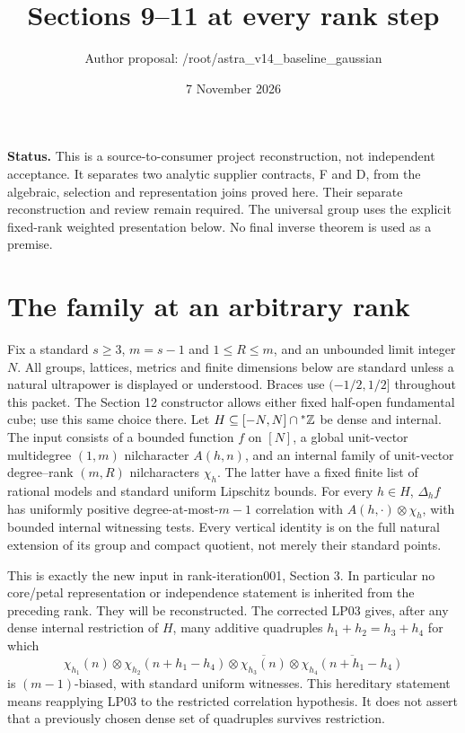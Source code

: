 \documentclass[11pt]{article}
\title{Sections 9--11 at every rank step}
\author{Author proposal: /root/astra\_v14\_baseline\_gaussian}
\date{7 November 2026}
\begin{document}
\maketitle

\noindent\textbf{Status.} This is a source-to-consumer project reconstruction,
not independent acceptance. It separates two analytic supplier contracts,
\textup{F} and \textup{D}, from the algebraic, selection and representation
joins proved here. Their separate reconstruction and review remain required.
The universal group uses the explicit fixed-rank weighted presentation below.
No final inverse theorem is used as a premise.

\section{The family at an arbitrary rank}
Fix a standard $s\geq3$, $m=s-1$ and $1\leq R\leq m$, and an unbounded
limit integer $N$. All groups, lattices, metrics and finite dimensions below
are standard unless a natural ultrapower is displayed or understood.
Braces use $(-1/2,1/2]$ throughout this packet. The Section 12 constructor
allows either fixed half-open fundamental cube; use this same choice there.
Let $H\subseteq[-N,N]\cap{}^*\mathbb Z$ be dense and internal. The input consists of
a bounded function $f$ on $[N]$, a global unit-vector multidegree $(1,m)$
nilcharacter $A(h,n)$, and an internal family of unit-vector degree--rank
$(m,R)$ nilcharacters $\chi_h$. The latter have a fixed finite list of rational
models and standard uniform Lipschitz bounds. For every $h\in H$,
$\Delta_h f$ has uniformly positive degree-at-most-$m-1$ correlation with
$A(h,\cdot)\otimes\chi_h$, with bounded internal witnessing tests.
Every vertical identity is on the full natural extension of its group and
compact quotient, not merely their standard points.

This is exactly the new input in rank-iteration001, Section 3. In particular
no core/petal representation or independence statement is inherited from
the preceding rank. They will be reconstructed. The corrected LP03 gives,
after any dense internal restriction of $H$, many additive quadruples
$h_1+h_2=h_3+h_4$ for which
\begin{equation}\label{eq:quad}
 \chi_{h_1}(n)\otimes\chi_{h_2}(n+h_1-h_4)
 \otimes\overline{\chi_{h_3}(n)}
 \otimes\overline{\chi_{h_4}(n+h_1-h_4)}
\end{equation}
is $(m-1)$-biased, with standard uniform witnesses. This hereditary statement
means reapplying LP03 to the restricted correlation hypothesis. It does not
assert that a previously chosen dense set of quadruples survives restriction.
\end{document}
